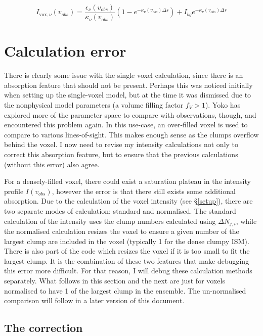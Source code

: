 \documentclass[a4paper]{article}
\begin{document}
    \[
    I_{\mathrm{vox},\nu} (v_{obs}) = \frac{\epsilon_\nu (v_{obs})}{\kappa_\nu (v_{obs})} \left( 1 - e^{-\kappa_\nu (v_{obs}) \Delta s} \right) + I_{bg} e^{-\kappa_\nu (v_{obs}) \Delta s}
    \]

    \pagebreak

    \section{Calculation error}

    There is clearly some issue with the single voxel calculation, since there is an absorption feature that should not be present.
    Perhaps this was noticed initially when setting up the single-voxel model, but at the time it was dismissed due to the nonphysical model parameters (a volume filling factor \(f_V > 1\)).
    Yoko has explored more of the parameter space to compare with observations, though, and encountered this problem again.
    In this use-case, an over-filled voxel is used to compare to various lines-of-sight.
    This makes enough sense as the clumps overflow behind the voxel.
    I now need to revise my intensity calculations not only to correct this absorption feature, but to ensure that the previous calculations (without this error) also agree.

    For a densely-filled voxel, there could exist a saturation plateau in the intensity profile \(I(v_{obs})\), however the error is that there still exists some additional absorption.
    Due to the calculation of the voxel intensity (see \S \ref{setup}), there are two separate modes of calculation: standard and normalised.
    The standard calculation of the intensity uses the clump numbers calculated using \(\Delta N_{j,i}\), while the normalised calculation resizes the voxel to ensure a given number of the largest clump are included in the voxel (typically 1 for the dense clumpy ISM).
    There is also part of the code which resizes the voxel if it is too small to fit the largest clump.
    It is the combination of these two features that make debugging this error more difficult.
    For that reason, I will debug these calculation methods separately.
    What follows in this section and the next are just for voxels normalised to have 1 of the largest clump in the ensemble.
    The un-normalised comparison will follow in a later version of this document.

    \subsection{The correction}
\end{document}
